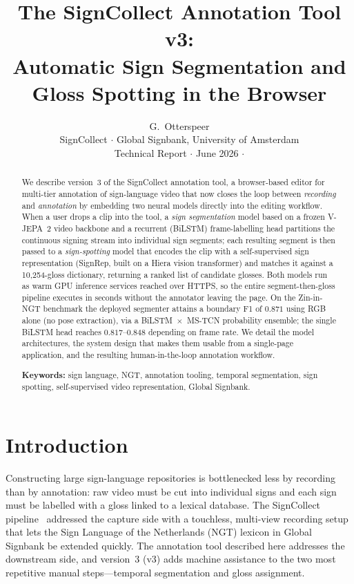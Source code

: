 \documentclass[11pt]{article}
\title{\vspace{-6mm}\textbf{The SignCollect Annotation Tool v3:\\
Automatic Sign Segmentation and Gloss Spotting in the Browser}}
\author{G.\ Otterspeer\\[2pt]
\small SignCollect $\cdot$ Global Signbank, University of Amsterdam\\
\small Technical Report $\cdot$ June 2026 $\cdot$ \code{signcollect.nl/annotation-tool}}
\date{}
\begin{document}
\maketitle
\thispagestyle{empty}

\begin{abstract}
\noindent We describe version~3 of the SignCollect annotation tool, a browser-based editor for
multi-tier annotation of sign-language video that now closes the loop between \emph{recording}
and \emph{annotation} by embedding two neural models directly into the editing workflow. When a
user drops a clip into the tool, a \emph{sign segmentation} model based on a frozen V-JEPA~2
video backbone and a recurrent (BiLSTM) frame-labelling head partitions the continuous signing
stream into individual sign segments; each resulting segment is then passed to a
\emph{sign-spotting} model that encodes the clip with a self-supervised sign representation
(SignRep, built on a Hiera vision transformer) and matches it against a 10{,}254-gloss
dictionary, returning a ranked list of candidate glosses. Both models run as warm GPU inference
services reached over HTTPS, so the entire segment-then-gloss pipeline executes in seconds
without the annotator leaving the page. On the Zin-in-NGT benchmark the deployed segmenter
attains a boundary F1 of $0.871$ using RGB alone (no pose extraction), via a
BiLSTM~$\times$~MS-TCN probability ensemble; the single BiLSTM head reaches $0.817$--$0.848$
depending on frame rate. We detail the model architectures, the system design that makes them
usable from a single-page application, and the resulting human-in-the-loop annotation workflow.

\smallskip
\noindent\textbf{Keywords:} sign language, NGT, annotation tooling, temporal segmentation, sign
spotting, self-supervised video representation, Global Signbank.
\end{abstract}

\section{Introduction}
Constructing large sign-language repositories is bottlenecked less by recording than by
annotation: raw video must be cut into individual signs and each sign must be labelled with a
gloss linked to a lexical database. The SignCollect pipeline~\cite{signcollect} addressed the
capture side with a touchless, multi-view recording setup that lets the Sign Language of the
Netherlands (NGT) lexicon in Global Signbank be extended quickly. The annotation tool described
here addresses the downstream side, and version~3 (v3) adds machine assistance to the two most
repetitive manual steps---temporal segmentation and gloss assignment.
\end{document}
